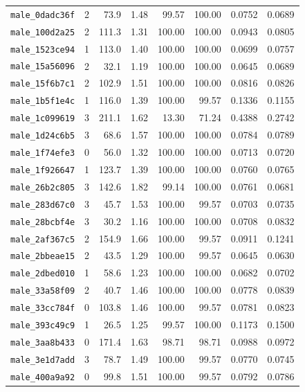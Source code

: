 \begin{longtable}{lrrrrrrr}
\texttt{male\_0dadc36f} & 2 & 73.9 & 1.48 & 99.57 & 100.00 & 0.0752 & 0.0689 \\
\texttt{male\_100d2a25} & 2 & 111.3 & 1.31 & 100.00 & 100.00 & 0.0943 & 0.0805 \\
\texttt{male\_1523ce94} & 1 & 113.0 & 1.40 & 100.00 & 100.00 & 0.0699 & 0.0757 \\
\texttt{male\_15a56096} & 2 & 32.1 & 1.19 & 100.00 & 100.00 & 0.0645 & 0.0689 \\
\texttt{male\_15f6b7c1} & 2 & 102.9 & 1.51 & 100.00 & 100.00 & 0.0816 & 0.0826 \\
\texttt{male\_1b5f1e4c} & 1 & 116.0 & 1.39 & 100.00 & 99.57 & 0.1336 & 0.1155 \\
\texttt{male\_1c099619} & 3 & 211.1 & 1.62 & 13.30 & 71.24 & 0.4388 & 0.2742 \\
\texttt{male\_1d24c6b5} & 3 & 68.6 & 1.57 & 100.00 & 100.00 & 0.0784 & 0.0789 \\
\texttt{male\_1f74efe3} & 0 & 56.0 & 1.32 & 100.00 & 100.00 & 0.0713 & 0.0720 \\
\texttt{male\_1f926647} & 1 & 123.7 & 1.39 & 100.00 & 100.00 & 0.0760 & 0.0765 \\
\texttt{male\_26b2c805} & 3 & 142.6 & 1.82 & 99.14 & 100.00 & 0.0761 & 0.0681 \\
\texttt{male\_283d67c0} & 3 & 45.7 & 1.53 & 100.00 & 99.57 & 0.0703 & 0.0735 \\
\texttt{male\_28bcbf4e} & 3 & 30.2 & 1.16 & 100.00 & 100.00 & 0.0708 & 0.0832 \\
\texttt{male\_2af367c5} & 2 & 154.9 & 1.66 & 100.00 & 99.57 & 0.0911 & 0.1241 \\
\texttt{male\_2bbeae15} & 2 & 43.5 & 1.29 & 100.00 & 99.57 & 0.0645 & 0.0630 \\
\texttt{male\_2dbed010} & 1 & 58.6 & 1.23 & 100.00 & 100.00 & 0.0682 & 0.0702 \\
\texttt{male\_33a58f09} & 2 & 40.7 & 1.46 & 100.00 & 100.00 & 0.0778 & 0.0839 \\
\texttt{male\_33cc784f} & 0 & 103.8 & 1.46 & 100.00 & 99.57 & 0.0781 & 0.0823 \\
\texttt{male\_393c49c9} & 1 & 26.5 & 1.25 & 99.57 & 100.00 & 0.1173 & 0.1500 \\
\texttt{male\_3aa8b433} & 0 & 171.4 & 1.63 & 98.71 & 98.71 & 0.0988 & 0.0972 \\
\texttt{male\_3e1d7add} & 3 & 78.7 & 1.49 & 100.00 & 99.57 & 0.0770 & 0.0745 \\
\texttt{male\_400a9a92} & 0 & 99.8 & 1.51 & 100.00 & 99.57 & 0.0792 & 0.0786 \\

\end{longtable}
